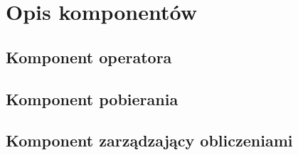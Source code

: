 \section{Opis komponentów}

\subsection{Komponent operatora}\label{subsec:component-operator}

\subsection{Komponent pobierania}\label{subsec:component-downloader}

\subsection{Komponent zarządzający obliczeniami}\label{subsec:component-manager}